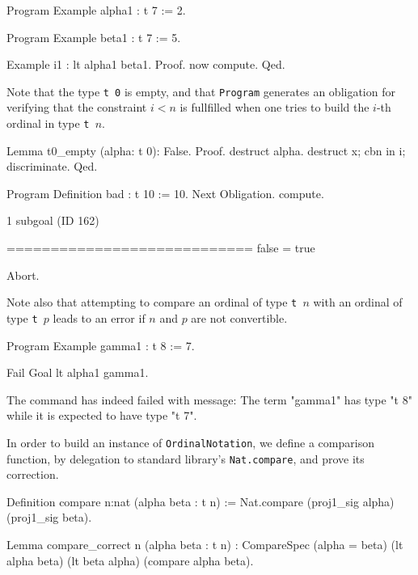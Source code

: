 
\begin{Coqsrc}
Program Example alpha1 : t 7 := 2.

Program Example beta1 : t 7 := 5.

Example i1 : lt  alpha1 beta1.
Proof.   now compute. Qed.
\end{Coqsrc}




Note that the type \texttt{t 0} is empty, and that \texttt{Program} generates an obligation
for verifying that the constraint $i<n$ is fullfilled when one tries to build the $i$-th ordinal in type \texttt{t $n$}.

\begin{Coqsrc}
Lemma t0_empty (alpha: t 0): False.
Proof.
  destruct alpha.
  destruct x; cbn in i; discriminate.
Qed.


Program Definition bad : t 10 := 10.
Next Obligation.
  compute.
\end{Coqsrc}

\begin{Coqanswer}
1 subgoal (ID 162)
  
  ============================
  false = true
\end{Coqanswer}

\begin{Coqsrc}
Abort.
\end{Coqsrc}

Note also that attempting to compare an ordinal of type \texttt{t $n$}  with an ordinal of
type \texttt{t $p$}  leads to an error if $n$ and $p$ are not convertible.

\begin{Coqsrc}

Program Example gamma1 : t 8 := 7.

Fail Goal lt alpha1 gamma1.
\end{Coqsrc}

\begin{Coqanswer}
 The command has indeed failed with message:
The term "gamma1" has type "t 8" while it is expected to have type "t 7".
\end{Coqanswer}


In order to build an instance of \texttt{OrdinalNotation}, we define a comparison function, by delegation to standard library's  \texttt{Nat.compare}, and prove its correction.

\begin{Coqsrc}
Definition compare {n:nat} (alpha beta : t n) :=
  Nat.compare (proj1_sig alpha) (proj1_sig beta).

Lemma compare_correct {n} (alpha beta : t n) :
  CompareSpec (alpha = beta) (lt alpha beta) (lt beta alpha)
              (compare alpha beta).
\end{Coqsrc}

